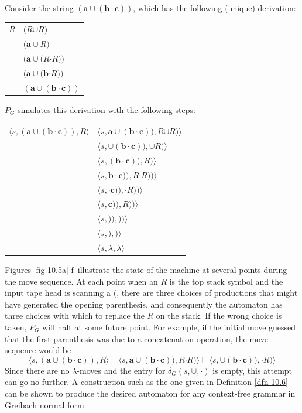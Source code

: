 Consider the string $\pmb{(a\cup(b\cdot c))}$, which has the following (unique)
derivation:
\begin{center}\begin{tabular}{r@{ $\Rightarrow$ }l}
$R$ & $\pmb{(}R\pmb{\cup}R\pmb{)}$ \\
& $\pmb{(a\cup}R\pmb{)}$ \\
& $\pmb{(a\cup(}R\pmb{\cdot}R\pmb{))}$ \\
& $\pmb{(a\cup(b}\pmb{\cdot}R\pmb{))}$ \\
& $\pmb{(a\cup(b\cdot c))}$
\end{tabular}\end{center}
$P_G$ simulates this derivation with the following steps:
\begin{center}\begin{tabular}{r@{ $\vdash$ }l}
$\langle s,\pmb{(a\cup(b\cdot c))},R\rangle$ & $\langle s,\pmb{a\cup(b\cdot
	c))},R\pmb{\cup}R\pmb{)}\rangle$ \\
& $\langle s,\pmb{\cup(b\cdot c))},\pmb{\cup}R\pmb{)}\rangle$ \\
& $\langle s,\pmb{(b\cdot c))},R\pmb{)}\rangle$ \\
& $\langle s,\pmb{b\cdot c))},R\pmb{\cdot}R\pmb{))}\rangle$ \\
& $\langle s,\pmb{\cdot c))},\pmb{\cdot}R\pmb{))}\rangle$ \\
& $\langle s,\pmb{c))},R\pmb{))}\rangle$ \\
& $\langle s,\pmb{))},\pmb{))}\rangle$ \\
& $\langle s,\pmb{)},\pmb{)}\rangle$ \\
& $\langle s,\lambda,\lambda\rangle$
\end{tabular}\end{center}

Figures \ref{fig-10.5a}-f\, illustrate the state of the machine at several points during the
move sequence. At each point when an $R$ is the top stack symbol and the input
tape head is scanning a $\pmb{(}$, there are three choices of productions that
might have generated the opening parenthesis, and consequently the automaton has
three choices with which to replace the $R$ on the stack. If the wrong choice is
taken, $P_G$ will halt at some future point. For example, if the initial move
guessed that the first parenthesis was due to a concatenation operation, the
move sequence would be
\[ \langle s,\pmb{(a\cup(b\cdot c))},R\rangle\vdash\langle s,\pmb{a\cup(b\cdot
	c))},R\pmb{\cdot}R\pmb{)}\rangle\vdash\langle s,\pmb{\cup(b\cdot c))},
	\pmb{\cdot}R\pmb{)}\rangle \]
Since there are no $\lambda$-moves and the entry for $\delta_G(s,\pmb{\cup},
\pmb{\cdot})$ is empty, this attempt can go no further. A construction such as
the one given in Definition \ref{dfn-10.6} can be shown to produce the desired automaton
for any context-free grammar in Greibach normal form.

